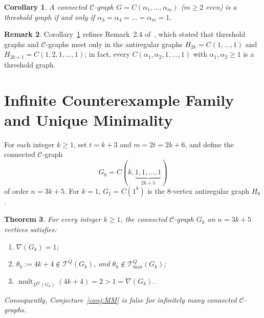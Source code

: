 \documentclass[11pt,a4paper]{article}
\newtheorem{theorem}{Theorem}[section]
\newtheorem{corollary}[theorem]{Corollary}
\theoremstyle{definition}
\newtheorem{remark}[theorem]{Remark}
\DeclareMathOperator{\mult}{mult}
\begin{document}
\begin{corollary}\label{cor:threshold}
  A connected $\mathcal{C}$-graph $G = C(\alpha_1,\dots,\alpha_m)$ ($m \ge 2$ even) is a threshold graph if and only if $\alpha_3 = \alpha_4 = \dots = \alpha_m = 1$.
\end{corollary}

\begin{remark}
  Corollary~\ref{cor:threshold} refines Remark~2.4 of~\cite{MMT2026}, which stated that threshold graphs and $\mathcal{C}$-graphs meet only in the antiregular graphs $H_{2k} = C(1,\dots,1)$ and $H_{2k+1} = C(1,2,1,\dots,1)$; in fact, every $C(\alpha_1,\alpha_2,1,\dots,1)$ with $\alpha_1,\alpha_2 \ge 1$ is a threshold graph.
\end{remark}

\section{Infinite Counterexample Family and Unique Minimality}\label{sec:disproof}

For each integer $k \ge 1$, set $t = k+3$ and $m = 2t = 2k+6$, and define the connected $\mathcal{C}$-graph
\[
  G_k = C(k, \underbrace{1, 1, \dots, 1}_{2k+5})
\]
of order $n = 3k + 5$. For $k = 1$, $G_1 = C(1^8)$ is the $8$-vertex antiregular graph $H_8$.

\begin{theorem}\label{thm:disproof}
  For every integer $k \ge 1$, the connected $\mathcal{C}$-graph $G_k$ on $n = 3k+5$ vertices satisfies:
  \begin{enumerate}
    \item $\nabla(G_k) = 1$;
    \item $\theta_k := 4k + 4 \notin \mathcal{T}^Q(G_k)$, and $\theta_k \notin \mathcal{T}^Q_{\max}(G_k)$;
    \item $\mult_{D^Q(G_k)}(4k + 4) = 2 > 1 = \nabla(G_k)$.
  \end{enumerate}
  Consequently, Conjecture~\ref{conj:MM} is false for infinitely many connected $\mathcal{C}$-graphs.
\end{theorem}
\end{document}
